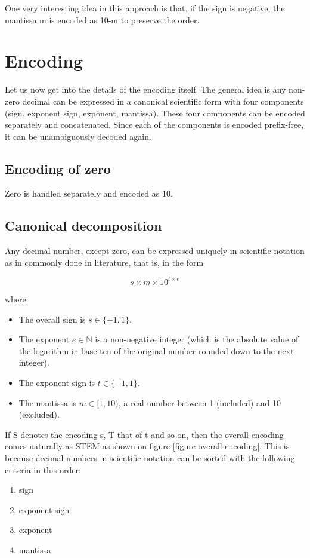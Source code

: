 \documentclass{acm_proc_article-sp}
\begin{document}
One very interesting idea in this approach is that, if the sign is negative, the mantissa m is encoded as 10-m to preserve the order.

\section{Encoding}

Let us now get into the details of the encoding itself. The general idea is any non-zero decimal can be expressed in a canonical scientific form with four components (sign, exponent sign, exponent, mantissa). These four components can be encoded separately and concatenated. Since each of the components is encoded prefix-free, it can be unambiguously decoded again.

\subsection{Encoding of zero}

Zero is handled separately and encoded as $10$.

\subsection{Canonical decomposition}

Any decimal number, except zero, can be expressed uniquely in scientific notation as in commonly done in literature, that is, in the form

$$s\times m \times10^{t\times e}$$

where:

\begin{itemize}
\item The overall sign is $s\in \{-1, 1\}$.
\item The exponent $e\in \mathbb{N}$ is a non-negative integer (which is the absolute value of the logarithm in base ten of the original number rounded down to the next integer).
\item The exponent sign is $t\in \{-1, 1\}$.
\item The mantissa is $m\in [1,10)$, a real number between 1 (included) and 10 (excluded).
\end{itemize}

If S denotes the encoding s, T that of t and so on, then the overall encoding comes naturally as STEM as shown on figure \ref{figure-overall-encoding}. This is because decimal numbers in scientific notation can be sorted with the following criteria in this order:
\begin{enumerate}
\item sign
\item exponent sign
\item exponent
\item mantissa
\end{enumerate}
\end{document}
